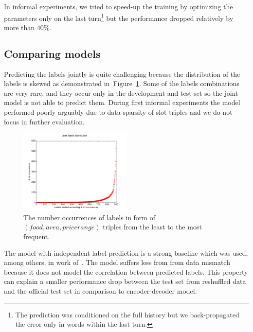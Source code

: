 \documentclass{itatnew}
\def\OD#1{{\color{darkgreen}OD: \it #1}}
\begin{document}
In informal experiments, we tried to speed-up the training by  optimizing the parameters only on the last turn\footnote{The prediction was conditioned on the full history but we back-propagated the error only in words within the last turn.} but the performance dropped relatively by more than 40\%.

\subsection{Comparing models}
\label{sec:eval}

Predicting the labels jointly is quite challenging because the distribution of the labels is skewed as demonstrated in~Figure~\ref{fig:labels}.
Some of the labels combinations are very rare, and they occur only in the development and test set so the joint model is not able to predict them.
During first informal experiments the model performed poorly arguably due to data sparsity of slot triples and we do not focus in further evaluation.

\begin{figure}
\includegraphics[width=0.5\textwidth]{jointLabelsDistrib}
\caption{The number occurrences of labels in form of $(food, area, pricerange)$ triples from the least to the most frequent.}
\label{fig:labels}
\end{figure}

The model with independent label prediction is a strong baseline which was used, among others, in work of~\cite{zilka2015incremental}.
The model suffers less from from data mismatch because it does not model the correlation between predicted labels.
This property can explain a smaller performance drop between the test set from reshuffled data and the official test set in comparison to encoder-decoder model.
\end{document}
